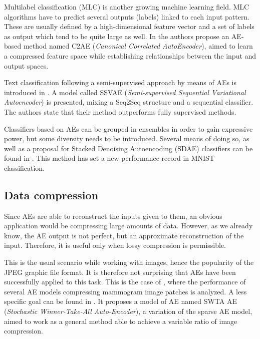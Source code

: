 Multilabel classification  (MLC) is another growing machine learning field. MLC algorithms have to predict several outputs (labels) linked to each input pattern. These are usually defined by a high-dimensional feature vector and a set of labels as output which tend to be quite large as well. In  the authors propose an AE-based method named C2AE (\textit{Canonical Correlated AutoEncoder}), aimed to learn a compressed feature space while establishing relationships between the input and output spaces.

Text classification following a semi-supervised approach by means of AEs is introduced in . A model called SSVAE (\textit{Semi-supervised Sequential Variational Autoencoder}) is presented, mixing a Seq2Seq  structure and a sequential classifier. The authors state that their method outperforms fully supervised methods.

Classifiers based on AEs can be grouped in ensembles in order to gain expressive power, but some diversity needs to be introduced. Several means of doing so, as well as a proposal for Stacked Denoising Autoencoding (SDAE) classifiers can be found in . This method has set a new performance record in MNIST classification.


\subsection{Data compression}
Since AEs are able to reconstruct the inputs given to them, an obvious application would be compressing large amounts of data. However, as we already know, the AE output is not perfect, but an approximate reconstruction of the input. Therefore, it is useful only when lossy compression is permissible. 

This is the usual scenario while working with images, hence the popularity of the JPEG  graphic file format. It is therefore not surprising that AEs have been successfully applied to this task. This is the case of , where the performance of several AE models compressing mammogram image patches is analyzed. A less specific goal can be found in . It proposes a model of AE named SWTA AE (\textit{Stochastic Winner-Take-All Auto-Encoder}), a variation of the sparse AE model, aimed to work as a general method able to achieve a variable ratio of image compression.

